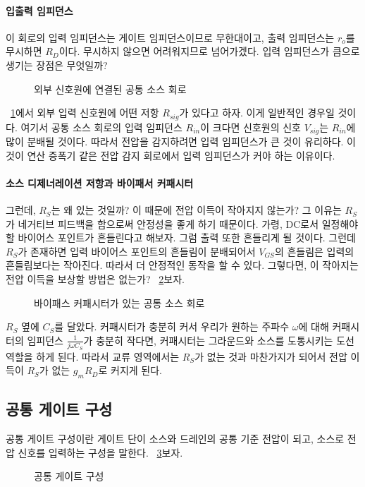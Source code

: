 \paragraph{입출력 임피던스}
이 회로의 입력 임피던스는 게이트 임피던스이므로 무한대이고, 출력 임피던스는 $r_o$를 무시하면 $R_D$이다. 무시하지 않으면 어려워지므로 넘어가겠다.
입력 임피던스가 큼으로 생기는 장점은 무엇일까?
\begin{figure}
    \centering
    \caption{외부 신호원에 연결된 공통 소스 회로}\label{fig:cs with external voltage signal}
\end{figure}
\figurename~\ref{fig:cs with external voltage signal}에서 외부 입력 신호원에 어떤 저항 $R_{sig}$가 있다고 하자. 이게 일반적인 경우일 것이다.
여기서 공통 소스 회로의 입력 임피던스 $R_{in}$이 크다면 신호원의 신호 $V_{sig}$는 $R_{in}$에 많이 분배될 것이다. 따라서 전압을 감지하려면 입력 임피던스가 큰 것이 유리하다.
이것이 연산 증폭기 같은 전압 감지 회로에서 입력 임피던스가 커야 하는 이유이다.
\paragraph{소스 디제너레이션 저항과 바이패서 커패시터}
그런데, $R_S$는 왜 있는 것일까? 이 때문에 전압 이득이 작아지지 않는가? 그 이유는 $R_S$가 네거티브 피드백을 함으로써 안정성을 좋게 하기 때문이다.
가령, DC로서 일정해야 할 바이어스 포인트가 흔들린다고 해보자. 그럼 출력 또한 흔들리게 될 것이다.
그런데 $R_S$가 존재하면 입력 바이어스 포인트의 흔들림이 분배되어서 $V_{GS}$의 흔들림은 입력의 흔들림보다는 작아진다. 따라서 더 안정적인 동작을 할 수 있다.
그렇다면, 이 작아지는 전압 이득을 보상할 방법은 없는가? \figurename~\ref{fig:cs with bypass cap}\을 보자.
\begin{figure}[!tpb]
    \centering
    \caption{바이패스 커패시터가 있는 공통 소스 회로}\label{fig:cs with bypass cap}
\end{figure}
$R_S$ 옆에 $C_S$를 달았다. 커패시터가 충분히 커서 우리가 원하는 주파수 $\omega$에 대해 커패시터의 임피던스 $\frac{1}{j\omega C_S}$가 충분히 작다면, 커패시터는 그라운드와 소스를 도통시키는 도선 역할을 하게 된다.
따라서 교류 영역에서는 $R_S$가 없는 것과 마찬가지가 되어서 전압 이득이 $R_S$가 없는 $g_mR_D$로 커지게 된다.

\subsection{공통 게이트 구성}
공통 게이트 구성이란 게이트 단이 소스와 드레인의 공통 기준 전압이 되고, 소스로 전압 신호를 입력하는 구성을 말한다. \figurename~\ref{fig:cg topology}\를 보자.
\begin{figure}[!hpb]
    \centering
    \caption{공통 게이트 구성}\label{fig:cg topology}
\end{figure}
